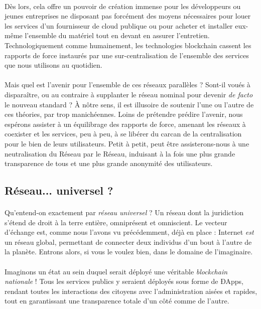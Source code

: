 \paragraph{} Dès lors, cela offre un pouvoir de création immense pour les développeurs ou jeunes entreprises ne disposant 
pas forcément des moyens nécessaires pour louer les services d'un fournisseur de cloud publique ou pour acheter et installer
eux-même l'ensemble du matériel tout en devant en assurer l'entretien. Technologiquement comme humainement, les technologies
blockchain cassent les rapports de force instaurés par une sur-centralisation de l'ensemble des services que nous utilisons
au quotidien.

\paragraph{} Mais quel est l'avenir pour l'ensemble de ces réseaux parallèles ? Sont-il voués à disparaître, ou au contraire
à supplanter le réseau nominal pour devenir \emph{de facto} le nouveau standard ? À nôtre sens, il est illusoire de soutenir
l'une ou l'autre de ces théories, par trop manichéennes. Loins de prétendre prédire l'avenir, nous espérons assister à un 
équilibrage des rapports de force, amenant les réseaux à coexister et les services, peu à peu, à se libérer du carcan de la
centralisation pour le bien de leurs utilisateurs. Petit à petit, peut être assisterons-nous à une neutralisation du Réseau
par le Réseau, induisant à la fois une plus grande transparence de tous et une plus grande anonymité des utilisateurs.


\subsection*{Réseau... universel ?}

\paragraph{} Qu'entend-on exactement par \emph{réseau universel} ? Un réseau \guillemotleft dont la juridiction s'étend de
droit à la terre entière\guillemotright \cite{Universel0}, omniprésent et omniscient. Le vecteur d'échange est, comme nous 
l'avons vu précédemment, déjà en place : Internet \emph{est} un réseau global, permettant de connecter deux individus d'un 
bout à l'autre de la planète. Entrons alors, si vous le voulez bien, dans le domaine de l'imaginaire.

\paragraph{} Imaginons un état au sein duquel serait déployé une véritable \emph{blockchain nationale} ! Tous les services
publics y seraient déployés sous forme de ÐApps, rendant toutes les interactions des citoyens avec l'administration aisées
et rapides, tout en garantissant une transparence totale d'un côté comme de l'autre. 

